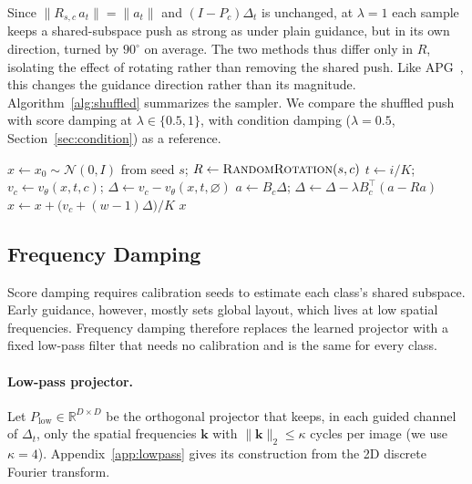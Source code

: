 \documentclass[sigconf,nonacm]{acmart}
\newcommand{\Dt}{\Delta_t}
\begin{document}
Since $\lVert R_{s,c}\,a_t \rVert = \lVert a_t \rVert$ and $(I - P_c)\Dt$ is unchanged, at $\lambda = 1$ each sample keeps a shared-subspace push as strong as under plain guidance, but in its own direction, turned by $90^\circ$ on average. The two methods thus differ only in $R$, isolating the effect of rotating rather than removing the shared push. Like APG~\cite{sadat2025apg}, this changes the guidance direction rather than its magnitude. Algorithm~\ref{alg:shuffled} summarizes the sampler. We compare the shuffled push with score damping at $\lambda \in \{0.5, 1\}$, with condition damping ($\lambda = 0.5$, Section~\ref{sec:condition}) as a reference.

\begin{algorithm}[t]
  \caption{Euler sampling with the shuffled push}
  \label{alg:shuffled}
  \begin{algorithmic}[1]
    \State $x \gets x_0 \sim \mathcal{N}(0, I)$ from seed $s$; \quad $R \gets \textsc{RandomRotation}(s, c)$
      \State $t \gets i/K$; \quad $v_c \gets v_\theta(x, t, c)$; \quad $\Delta \gets v_c - v_\theta(x, t, \varnothing)$
        \State $a \gets B_c \Delta$; \quad $\Delta \gets \Delta - \lambda B_c^{\top}(a - R a)$
      \EndIf
      \State $x \gets x + \big(v_c + (w-1)\Delta\big)/K$
    \EndFor
    \State \Return $x$
  \end{algorithmic}
\end{algorithm}

\subsection{Frequency Damping}
\label{sec:frequency}

Score damping requires calibration seeds to estimate each class's shared subspace. Early guidance, however, mostly sets global layout, which lives at low spatial frequencies. Frequency damping therefore replaces the learned projector with a fixed low-pass filter that needs no calibration and is the same for every class.

\paragraph{Low-pass projector.}
Let $P_{\text{low}} \in \mathbb{R}^{D \times D}$ be the orthogonal projector that keeps, in each guided channel of $\Dt$, only the spatial frequencies $\mathbf{k}$ with $\lVert \mathbf{k} \rVert_2 \le \kappa$ cycles per image (we use $\kappa = 4$). Appendix~\ref{app:lowpass} gives its construction from the 2D discrete Fourier transform.
\end{document}
